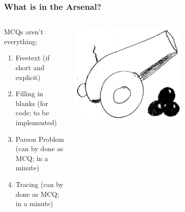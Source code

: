 \begin{frame}
  \frametitle{What is in the Arsenal?}
  \begin{columns}
   \begin{column}{.5\textwidth}
    MCQs aren't everything:
     \begin{enumerate}
      \item Freetext (if short and explicit)
      \item Filling in blanks (for code; to be implemented)
      \item Parson Problem (can by done as MCQ; in a minute)
      \item Tracing (can by done as MCQ; in a minute)
     \end{enumerate}
   \end{column}
   \begin{column}{.5\textwidth}
       \centering
      \includegraphics[width=0.6\textwidth]{images/arsenal}
    \end{column}
  \end{columns}
%      
\end{frame}
